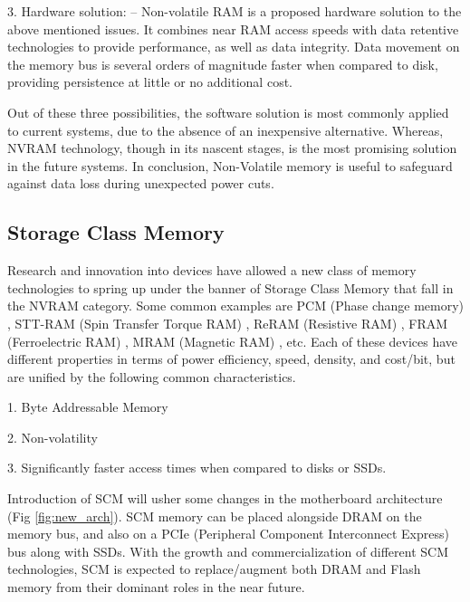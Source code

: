 3. Hardware solution: -- Non-volatile RAM is a proposed hardware solution to the above mentioned issues. It combines near RAM access speeds with data retentive technologies to provide performance, as well as data integrity. Data movement on the memory bus is several orders of magnitude faster when compared to disk, providing persistence at little or no additional cost.

Out of these three possibilities, the software solution is most commonly applied to current systems, due to the absence of an inexpensive alternative. Whereas, NVRAM technology, though in its nascent stages, is the most promising solution in the future systems. In conclusion, Non-Volatile memory is useful to safeguard against data loss during unexpected power cuts. 

\subsection{Storage Class Memory}

Research and innovation into devices have allowed a new class of memory technologies to spring up under the banner of Storage Class Memory that fall in the NVRAM category. Some common examples are PCM (Phase change memory) \cite{pcm}, STT-RAM (Spin Transfer Torque RAM) \cite{sttram}, ReRAM (Resistive RAM) \cite{reram1} \cite{reram2}, FRAM (Ferroelectric RAM) \cite{feram}, MRAM (Magnetic RAM) \cite{mram1} \cite{mram2}, etc. Each of these devices have different properties in terms of power efficiency, speed, density, and cost/bit, but are unified by the following common characteristics.

1. Byte Addressable Memory

2. Non-volatility

3. Significantly faster access times when compared to disks or SSDs.

Introduction of SCM will usher some changes in the motherboard architecture (Fig \ref{fig:new_arch}). SCM memory can be placed alongside DRAM on the memory bus, and also on a PCIe (Peripheral Component Interconnect Express) bus along with SSDs. With the growth and commercialization of different SCM technologies, SCM is expected to replace/augment both DRAM and Flash memory from their dominant roles in the near future. 

\setlength{\belowcaptionskip}{-10pt}

